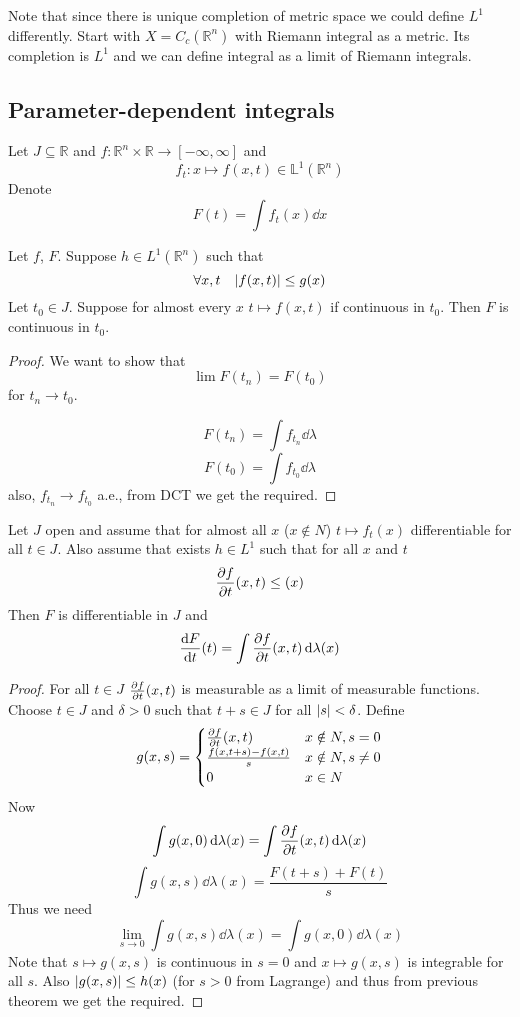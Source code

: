 Note that since there is unique completion of metric space we could define $L^1$ differently. Start with $X=C_c(\mathbb{R}^n)$ with Riemann integral as a  metric. Its completion is $L^1$ and we can define integral as a limit of Riemann integrals.

\subsection{Parameter-dependent integrals}
Let $J\subseteq \mathbb{R}$ and $f: \mathbb{R}^n\times \mathbb{R} \to [-\infty,\infty]$ and
$$f_t: x \mapsto f(x,t) \in \mathbb{L}^1(\mathbb{R}^n)$$
Denote
$$F(t) = \int f_t(x) \dd{x}$$

\begin{theorem}
	Let $f$, $F$. Suppose $h\in L^1(\mathbb{R}^n)$ such that
	$$\forall x,t \quad \abs{f(x,t)} \leq g(x)$$
	Let $t_0\in J$. Suppose for almost every $x$ $t\mapsto f(x,t)$ if continuous in $t_0$. Then $F$ is continuous in $t_0$.
	
	\begin{proof}
		We want to show that
		$$\lim F(t_n) = F(t_0)$$
		for $t_n\to t_0$.
		
		$$F(t_n) = \int f_{t_n} \dd{\lambda}$$
		$$F(t_0) = \int f_{t_0} \dd{\lambda}$$
		also, $f_{t_n} \to f_{t_0}$ a.e., from DCT we get the required.
	\end{proof}
\end{theorem}

\begin{theorem}
	Let $J$ open and assume that for almost all $x$ ($x\notin N$) $t\mapsto f_t(x)$  differentiable for all $t\in J$. Also assume that exists $h\in L^1$ such that for all $x$ and $t$ 
	$$\pdv{f}{t} \qty(x,t) \leq (x)$$
	Then $F$ is differentiable in $J$ and
	$$\dv{F}{t} \qty(t) = \int \pdv{f}{t} \qty(x,t)  \dd{\lambda(x)}$$
	\begin{proof}
		For all $t\in J$ $\pdv{f}{t} \qty(x,t) $ is measurable as a limit of measurable functions. Choose $t\in J$ and $\delta>0$ such that $t+s \in J$ for all $\abs{s}<\delta$. Define
		$$g(x,s) =\begin{cases}
		\pdv{f}{t} \qty(x,t) & x\notin N, s=0\\
		\frac{f(x,t+s)-f(x,t)}{s}& x\notin N, s\neq0\\
		0& x\in N
		\end{cases}$$
		Now
		$$\int g(x,0) \dd{\lambda(x)}= \int \pdv{f}{t} \qty(x,t) \dd{\lambda(x)}$$
		$$\int g(x,s) \dd{\lambda(x)}= \frac{F(t+s)+F(t)}{s}$$
		Thus we need
		$$\lim_{s\to 0} \int g(x,s) \dd{\lambda(x)} = \int g(x,0) \dd{\lambda(x)}$$
		Note that $s\mapsto g(x,s)$ is continuous in $s=0$ and $x\mapsto g(x,s)$ is integrable for all $s$. Also $\abs{g(x,s)} \leq h(x)$ (for $s>0$ from Lagrange) and thus from previous theorem we get the required.
	\end{proof}
\end{theorem}

